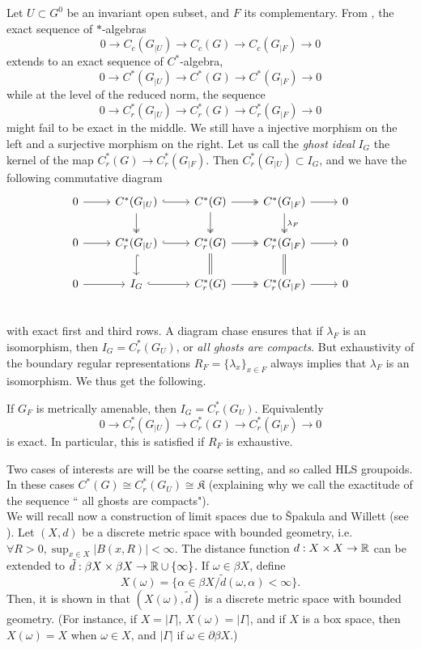 Let $U\subset G^0$ be an invariant open subset, and $F$ its complementary. From \cite{Renault}, the exact sequence of $*$-algebras 
\[0\rightarrow C_c(G_{|U}) \rightarrow C_c(G)\rightarrow C_c(G_{|F})\rightarrow 0\]  
extends to an exact sequence of $C^*$-algebra,
\[0\rightarrow C^*(G_{|U}) \rightarrow C^*(G)\rightarrow C^*(G_{|F})\rightarrow 0\]
while at the level of the reduced norm, the sequence 
\[0\rightarrow C_r^*(G_{|U}) \rightarrow C_r^*(G)\rightarrow C_r^*(G_{|F})\rightarrow 0\]
might fail to be exact in the middle. We still have a injective morphism on the left and a surjective morphism on the right. Let us call the \textit{ghost ideal} $I_G$ the kernel of the map $C^*_r(G)\rightarrow C^*_r(G_{|F})$. Then $C^*_r(G_{|U}) \subset I_G$, and we have the following commutative diagram
\[\begin{tikzcd}
0 \arrow{r} &  C^*(G_{|U}) \arrow[r,hook] \arrow[d, two heads] & C^*(G)\arrow[r, two heads] \arrow[d, two heads] & C^*(G_{|F})\arrow{r} \arrow[d, two heads, "\lambda_F" ] & 0 \\
0 \arrow{r} &  C_r^*(G_{|U})\arrow[r,hook] \arrow[d,hook] & C_r^*(G)\arrow[r, two heads]  \arrow[d,equal] & C_r^*(G_{|F})\arrow{r} \arrow[d,equal] & 0 \\
0 \arrow{r} &  I_G \arrow[r,hook] & C_r^*(G)\arrow[r, two heads] & C_r^*(G_{|F})\arrow{r} & 0 \\
\end{tikzcd}\]
with exact first and third rows. A diagram chase ensures that if $\lambda_F$ is an isomorphism, then $I_G=C^*_r(G_U)$, or \textit{all ghosts are compacts}. But exhaustivity of the boundary regular representations $R_F=\{\lambda_x\}_{x\in F}$ always implies that $\lambda_F$ is an isomorphism. We thus get the following.

\begin{prop}
If $G_F$ is metrically amenable, then $I_G=C^*_r(G_U)$. Equivalently
\[0\rightarrow C_r^*(G_{|U}) \rightarrow C_r^*(G)\rightarrow C_r^*(G_{|F})\rightarrow 0\]
is exact. In particular, this is satisfied if $R_F$ is exhaustive.
\end{prop} 

Two cases of interests are will be the coarse setting, and so called HLS groupoids. In these cases $C^*(G) \cong C^*_r(G_U) \cong \mathfrak K$ (explaining why we call the exactitude of the sequence `` all ghosts are compacts"). \\

We will recall now a construction of limit spaces due to \v{S}pakula and Willett (see \cite{vspakula2017metric}). Let $(X,d)$ be a discrete metric space with bounded geometry, i.e. $\forall R>0, \sup_{x\in X} |B(x,R)| < \infty$. The distance function $d: X\times X \rightarrow \mathbb R$ can be extended to $\tilde d: \beta X \times \beta X \rightarrow \mathbb R \cup \{\infty\}$. If $\omega \in \beta X$, define 
\[X(\omega) = \{\alpha \in \beta X / \tilde d (\omega , \alpha ) < \infty\}.\]
Then, it is shown in \cite{vspakula2017metric} that $(X(\omega), \tilde d)$ is a discrete metric space with bounded geometry. (For instance, if $X=|\Gamma|$, $X(\omega)=|\Gamma | $, and if $X$ is a box space, then $X(\omega) = X$ when $\omega \in X$, and $|\Gamma|$ if $\omega\in \partial \beta X$.)\\

